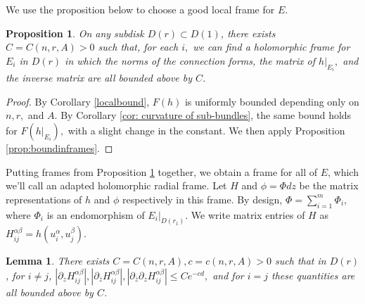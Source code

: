 \documentclass[10pt]{amsart}
\newtheorem{lem}[thm]{Lemma}
\newtheorem{prop}[thm]{Proposition}
\theoremstyle{definition}
\begin{document}
We use the proposition below to choose a good local frame for $E$.  
\begin{prop}\label{prop:E_iframe}
    On any subdisk $D(r)\subset D(1)$, there exists $C=C(n,r, A)>0$ such that, for each $i,$ we can find a holomorphic frame for $E_i$ in $D(r)$ in which the norms of the connection forms, the matrix of $h|_{E_i},$ and the inverse matrix are all bounded above by $C$.
\end{prop}
\begin{proof}
   By Corollary \ref{localbound}, $F(h)$ is uniformly bounded depending only on $n,r,$ and $A$. By Corollary \ref{cor: curvature of sub-bundles}, the same bound holds for $F(h|_{E_i}),$ with a slight change in the constant. We then apply Proposition \ref{prop:boundinframes}.
\end{proof}
Putting frames from Proposition \ref{prop:E_iframe} together, we obtain a frame for all of $E$, which we'll call an adapted holomorphic radial frame. Let $H$ and $\phi=\Phi dz$ be the matrix representations of $h$ and $\phi$ respectively in this frame. By design, $\Phi = \sum_{i=1}^m \Phi_i,$ where $\Phi_i$ is an endomorphism of $E_i|_{D(r_1)}.$ We write matrix entries of $H$ as $H_{ij}^{\alpha\beta}=h(u_i^\alpha,u_j^\beta).$ 
\begin{lem}\label{localhobounds}
There exists $C=C(n,r,A), c=c(n,r,A)>0$ such that in $D(r)$, for $i\neq j$, 
 $|\partial_z H_{ij}^{\alpha\beta}|,|\partial_{\overline{z}}H_{ij}^{\alpha\beta}|, |\partial_{\overline{z}}\partial_z H_{ij}^{\alpha\beta}|\leq Ce^{-cd},$ and for $i=j$ these quantities are all bounded above by $C$.
\end{lem}
\end{document}
